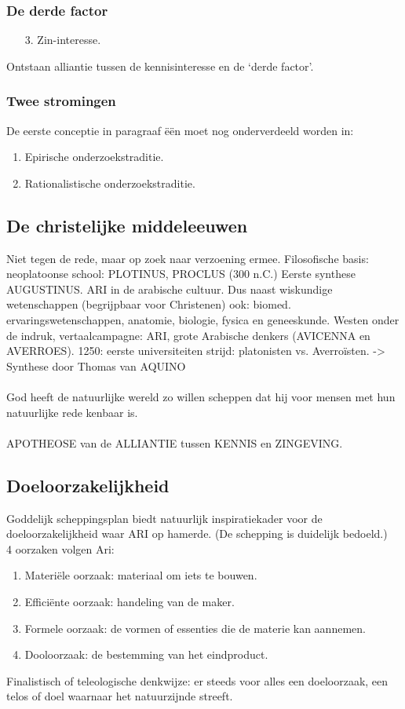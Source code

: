 \documentclass[11pt,a4paper]{article}
\begin{document}
\subsubsection{De derde factor}
\begin{enumerate}
\item[3.]Zin-interesse.
\end{enumerate}
Ontstaan alliantie tussen de kennisinteresse en de ‘derde factor’.
\subsubsection{Twee stromingen}
De eerste conceptie in paragraaf \"e\"en moet nog onderverdeeld worden in:
\begin{enumerate}
\item Epirische onderzoekstraditie.
\item Rationalistische onderzoekstraditie.
\end{enumerate}
\subsection{De christelijke middeleeuwen}
Niet tegen de rede, maar op zoek naar verzoening ermee.
Filosofische basis: neoplatoonse school: PLOTINUS, PROCLUS (300 n.C.) Eerste synthese AUGUSTINUS.
ARI in de arabische cultuur. Dus naast wiskundige wetenschappen (begrijpbaar voor Christenen) ook: biomed. ervaringswetenschappen, anatomie, biologie, fysica en geneeskunde.
Westen onder de indruk, vertaalcampagne: ARI, grote Arabische denkers (AVICENNA en AVERROES).
1250: eerste universiteiten strijd: platonisten vs. Averroïsten.
-> Synthese door Thomas van AQUINO
\\
\\
God heeft de natuurlijke wereld zo willen scheppen dat hij voor mensen met hun natuurlijke rede kenbaar is.
\\
\\
APOTHEOSE van de ALLIANTIE tussen KENNIS en ZINGEVING.
\subsection{Doeloorzakelijkheid}
Goddelijk scheppingsplan biedt natuurlijk inspiratiekader voor de doeloorzakelijkheid waar ARI op hamerde. (De schepping is duidelijk bedoeld.)
\\
4 oorzaken volgen Ari:
\begin{enumerate}
\item Materi\"ele oorzaak: materiaal om iets te bouwen.
\item Effici\"ente oorzaak: handeling van de maker.
\item Formele oorzaak: de vormen of essenties die de materie kan aannemen.
\item Dooloorzaak: de bestemming van het eindproduct.
\end{enumerate}
Finalistisch of teleologische denkwijze: er steeds voor alles een doeloorzaak, een telos of doel waarnaar het natuurzijnde streeft.
\end{document}
